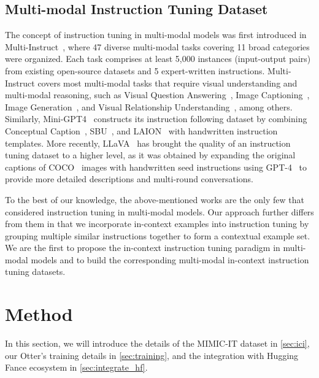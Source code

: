 \documentclass{article}
\begin{document}
\subsection{Multi-modal Instruction Tuning Dataset}
The concept of instruction tuning in multi-modal models was first introduced in Multi-Instruct~\cite{xu2022multiinstruct}, where 47 diverse multi-modal tasks covering 11 broad categories were organized. Each task comprises at least 5,000 instances (input-output pairs) from existing open-source datasets and 5 expert-written instructions. Multi-Instruct covers most multi-modal tasks that require visual understanding and multi-modal reasoning, such as Visual Question Answering~\cite{goyal2017making,zhu2016visual7w,suhr2017corpus}, Image Captioning~\cite{coco}, Image Generation~\cite{cc12m}, and Visual Relationship Understanding~\cite{vg}, among others. Similarly, Mini-GPT4~\cite{mini_gpt4} constructs its instruction following dataset by combining Conceptual Caption~\cite{cc3m,cc12m}, SBU~\cite{im2text}, and LAION~\cite{laion_400m} with handwritten instruction templates. More recently, LLaVA~\cite{llava} has brought the quality of an instruction tuning dataset to a higher level, as it was obtained by expanding the original captions of COCO~\cite{coco} images with handwritten seed instructions using GPT-4~\cite{gpt4} to provide more detailed descriptions and multi-round conversations.

To the best of our knowledge, the above-mentioned works are the only few that considered instruction tuning in multi-modal models. Our approach further differs from them in that we incorporate in-context examples into instruction tuning by grouping multiple similar instructions together to form a contextual example set. We are the first to propose the in-context instruction tuning paradigm in multi-modal models and to build the corresponding multi-modal in-context instruction tuning datasets.

 \section{Method}

In this section, we will introduce the details of the MIMIC-IT dataset in \cref{sec:ici}, our Otter's training details in \cref{sec:training}, and the integration with Hugging Fance ecosystem in \cref{sec:integrate_hf}.
\end{document}
